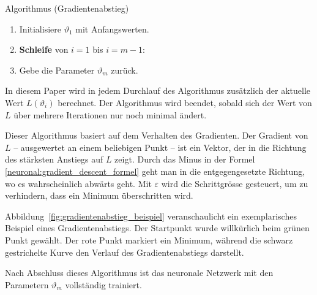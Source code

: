 \begin{aufgabe}
    Algorithmus (Gradientenabstieg)
    \begin{enumerate}
        \item Initialisiere \( \vartheta_1 \) mit Anfangswerten.
        \item \textbf{Schleife} von \( i = 1 \) bis \( i = m - 1 \):
        \item Gebe die Parameter \( \vartheta_m \) zurück.
    \end{enumerate}
    \label{neuronal:gradient_descent}
\end{aufgabe}

In diesem Paper wird in jedem Durchlauf des Algorithmus zusätzlich der aktuelle Wert \( L(\vartheta_i) \) berechnet.
Der Algorithmus wird beendet, sobald sich der Wert von \( L \) über mehrere Iterationen nur noch minimal ändert.

Dieser Algorithmus basiert auf dem Verhalten des Gradienten.
Der Gradient von $L$ -- ausgewertet an einem beliebigen Punkt -- ist ein Vektor, der in die Richtung des stärksten Anstiegs auf $L$ zeigt.
Durch das Minus in der Formel \eqref{neuronal:gradient_descent_formel} geht man in die entgegengesetzte Richtung, wo es wahrscheinlich abwärts geht.
Mit $\varepsilon$ wird die Schrittgrösse gesteuert, um zu verhindern, dass ein Minimum überschritten wird.

Abbildung~\ref{fig:gradientenabstieg_beispiel} veranschaulicht ein exemplarisches Beispiel eines Gradientenabstiegs.
Der Startpunkt wurde willkürlich beim grünen Punkt gewählt.
Der rote Punkt markiert ein Minimum, während die schwarz gestrichelte Kurve den Verlauf des Gradientenabstiegs darstellt.

Nach Abschluss dieses Algorithmus ist das neuronale Netzwerk mit den Parametern \( \vartheta_m \) vollständig trainiert.

